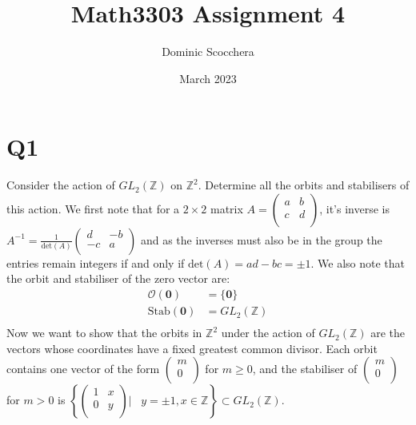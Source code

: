 \documentclass{article}
\title{Math3303 Assignment 4}
\author{Dominic Scocchera}
\date{March 2023}
\begin{document}
\maketitle
\section*{Q1}
Consider the action of $GL_2(\mathbb{Z})$ on $\mathbb{Z}^2$. Determine all the orbits and stabilisers of this action.
\newline\newline
We first note that for a $2\times2$ matrix $A=\begin{pmatrix}
a & b\\
c & d\\
\end{pmatrix}$, it's inverse is $A^{-1}=\frac{1}{\text{det}(A)}\begin{pmatrix}
d & -b\\
-c & a\\
\end{pmatrix}$ and as the inverses must also be in the group the entries remain integers if and only if $\text{det}(A)=ad-bc=\pm 1$. We also note that the orbit and stabiliser of the zero vector are:
\begin{align*}
\mathcal{O}(\mathbf{0})&=\{\mathbf{0}\}\\
\text{Stab}(\mathbf{0})&=GL_2(\mathbb{Z})\\
\end{align*}
Now we want to show that the orbits in $\mathbb{Z}^2$ under the action of $GL_2(\mathbb{Z})$ are the vectors whose coordinates have a fixed greatest common divisor. Each orbit contains one vector of the form $\begin{pmatrix}
m\\
0\\
\end{pmatrix}$ for $m\geq 0$, and the stabiliser of $\begin{pmatrix}
m\\
0\\
\end{pmatrix}$ for $m > 0$ is $\left\{\begin{pmatrix}
1 & x\\
0 & y\\
\end{pmatrix} |\;\;\; y = \pm1,x\in\mathbb{Z}\right\} \subset GL_2(\mathbb{Z})$.
\end{document}
